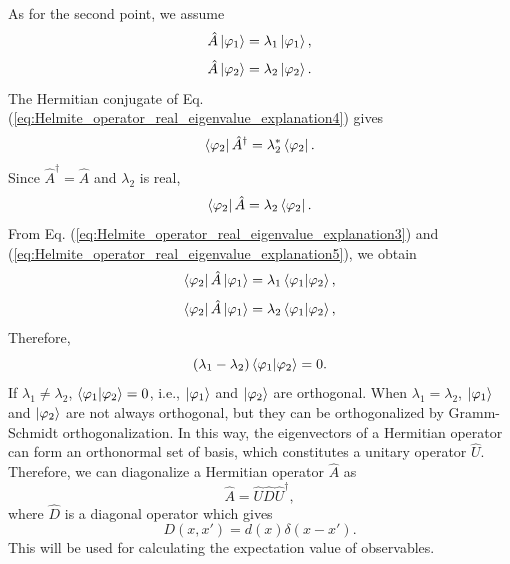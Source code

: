 As for the second point, we assume 
\begin{equation}
  \hat A \ket {\varphi_1} = \lambda_1\ket {\varphi_1},
  \label{eq:Helmite_operator_real_eigenvalue_explanation3}
\end{equation}
\begin{equation}
  \hat A \ket {\varphi_2} = \lambda_2\ket {\varphi_2}.
    \label{eq:Helmite_operator_real_eigenvalue_explanation4}
\end{equation}
The Hermitian conjugate of Eq. (\ref{eq:Helmite_operator_real_eigenvalue_explanation4})
gives
\begin{equation}
  \bra{\varphi_2}\hat A^\dagger = \lambda_2^*\bra{\varphi_2}.
\end{equation}
Since $\hat A^\dagger = \hat A$ and $\lambda_2$ is real,
\begin{equation}
  \bra{\varphi_2}\hat A = \lambda_2\bra{\varphi_2}.
    \label{eq:Helmite_operator_real_eigenvalue_explanation5}
\end{equation}
From Eq. (\ref{eq:Helmite_operator_real_eigenvalue_explanation3}) and (\ref{eq:Helmite_operator_real_eigenvalue_explanation5}), we obtain
\begin{equation}
  \bra{\varphi_2}\hat A\ket{\varphi_1} = \lambda_1\braket{\varphi_1|\varphi_2},
\end{equation}
\begin{equation}
  \bra{\varphi_2}\hat A\ket{\varphi_1} = \lambda_2\braket{\varphi_1|\varphi_2},
\end{equation}
Therefore,
\begin{equation}
(\lambda_1 - \lambda_2)\braket{\varphi_1|\varphi_2} = 0.
\end{equation}
If $\lambda_1 \neq \lambda_2$, $\braket{\varphi_1|\varphi_2}=0$, i.e., $\ket {\varphi_1}$ and $\ket{\varphi_2}$ are orthogonal. When $\lambda_1=\lambda_2$, $\ket {\varphi_1}$ and $\ket{\varphi_2}$ are not always orthogonal, but they can be orthogonalized by Gramm-Schmidt orthogonalization. In this way, the eigenvectors of a Hermitian operator can form an orthonormal set of basis, which constitutes a unitary operator $\hat U$. Therefore, we can diagonalize a Hermitian operator $\hat A$ as
\begin{equation}
  \hat A = \hat U\hat D\hat U^\dagger,
  \label{eq:diagonalization_of_Hermitian_operator}
\end{equation}
where $\hat D$ is a diagonal operator which gives
\begin{equation}
  D(x,x') = d(x)\delta(x-x').
  \label{eq:diagonal_operator}
\end{equation}
This will be used for calculating the expectation value of observables.

